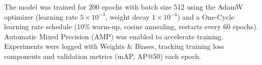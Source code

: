 The model was trained for 200 epochs with batch size 512 using the AdamW optimizer (learning rate $5\times10^{-3}$, weight decay $1\times10^{-4}$) and a One-Cycle learning rate schedule (10\% warm-up, cosine annealing, restarts every 60 epochs). Automatic Mixed Precision (AMP) was enabled to accelerate training. Experiments were logged with Weights \& Biases, tracking training loss components and validation metrics (mAP, AP@50) each epoch.
